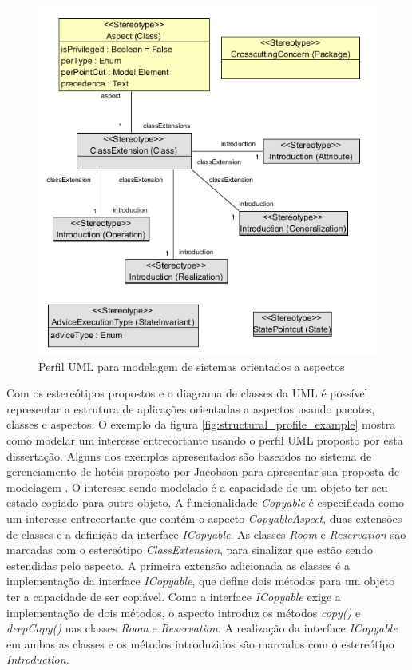 \begin{figure}[!h] \centering
	\includegraphics{img/full_profile.png}
	\caption{Perfil UML para modelagem de sistemas orientados a aspectos}\label{fig:uml_profile}
\end{figure}

Com os estereótipos propostos e o diagrama de classes da UML é possível representar a estrutura de aplicações orientadas a aspectos usando
pacotes, classes e aspectos. O exemplo da figura \ref{fig:structural_profile_example} mostra como modelar um interesse entrecortante usando o perfil
UML proposto por esta dissertação. Alguns dos exemplos apresentados são baseados no sistema de gerenciamento de hotéis proposto por Jacobson para
apresentar sua proposta de modelagem \cite{Jacobson:2004:ASD:1062430}. O interesse sendo modelado é a capacidade de um objeto ter seu estado copiado
para outro objeto. A funcionalidade \textit{Copyable} é especificada como um interesse entrecortante que contém o aspecto
\textit{CopyableAspect}, duas extensões de classes e a definição da interface \textit{ICopyable}. As classes \textit{Room} e \textit{Reservation}
são marcadas com o estereótipo \textit{ClassExtension}, para sinalizar que estão sendo estendidas pelo aspecto. A primeira extensão adicionada as
classes é a implementação da interface \textit{ICopyable}, que define dois métodos para um objeto ter a capacidade de ser copiável. Como a interface
\textit{ICopyable} exige a implementação de dois métodos, o aspecto introduz os métodos \textit{copy()} e \textit{deepCopy()} nas classes \textit{Room} e \textit{Reservation}. 
A realização da interface \textit{ICopyable} em ambas as classes e os métodos introduzidos são marcados com o estereótipo \textit{Introduction}.

